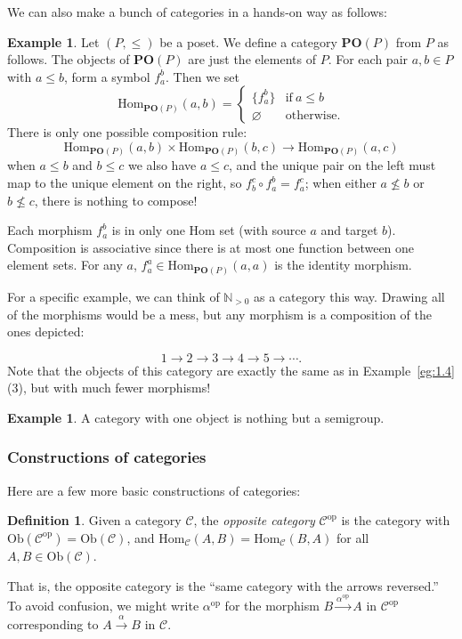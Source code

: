 \documentclass{amsart}[12pt]
\newcommand{\Hom}{\mathrm{Hom}}
\def\sC{\mathscr C}
\newcommand{\N}{\mathbb{N}}
\newcommand{\DEF}[1]{\emph{#1}\index{#1}}
\newcommand{\Def}[1]{#1 \index{#1}}
\numberwithin{equation}{section}
\theoremstyle{plain} %
\theoremstyle{definition}
\newtheorem{defn}[equation]{Definition}
\newtheorem{ex}[equation]{Example}
\theoremstyle{remark}
\newcommand{\sssec}[1]{\subsubsection{#1}}
\newcommand{\Ob}{\mathrm{Ob}}
\newcommand{\PO}{\mathbf{PO}}
\begin{document}
We can also make a bunch of categories in a hands-on way as follows:

\begin{ex} Let $(P,\leq)$ be a poset.
We define a category \Def{$\PO(P)$} from $P$ as follows. The objects of $\PO(P)$ are just the elements of $P$.
For each pair $a,b\in P$ with $a\leq b$, form a symbol $f_a^b$. Then we set
\[ \Hom_{\PO(P)}(a,b) = \begin{cases} \{f_a^b\} &\text{if}\  a\leq b \\ \varnothing & \text{otherwise}. \end{cases}\]
There is only one possible composition rule:
\[ \Hom_{\PO(P)}(a,b) \times \Hom_{\PO(P)}(b,c) \longrightarrow \Hom_{\PO(P)}(a,c)\]
when $a\leq b$ and $b\leq c$ we also have $a\leq c$, and the unique pair on the left must map to the unique element on the right, so $f_b^c \circ f_a^b = f_a^c$; when either $a\not\leq b$ or $b\not\leq c$, there is nothing to compose!

Each morphism $f_a^b$ is in only one Hom set (with source $a$ and target $b$). Composition is associative since there is at most one function between one element sets. For any $a$, $f_a^a\in \Hom_{\PO(P)}(a,a)$ is the identity morphism.

For a specific example, we can think of $\N_{> 0}$ as a category this way. Drawing all of the morphisms would be a mess, but any morphism is a composition of the ones depicted:

\[  1 \longrightarrow 2 \longrightarrow 3 \longrightarrow 4 \longrightarrow 5 \longrightarrow \cdots .\] 
Note that the objects of this category are exactly the same as in Example~\ref{eg:1.4}(3), but with much fewer morphisms!
\end{ex}

\begin{ex} A category with one object is nothing but a semigroup.\end{ex}

\sssec{Constructions of categories}

Here are a few more basic constructions of categories:

\begin{defn} Given a category $\sC$, the \DEF{opposite category} \Def{$\sC^{\mathrm{op}}$} is the category with $\Ob(\sC^{\mathrm{op}})=\Ob(\sC)$, and $\Hom_{\sC}(A,B) = \Hom_{\sC}(B,A)$ for all $A,B\in \Ob(\sC)$.
\end{defn}

That is, the opposite category is the ``same category with the arrows reversed.'' To avoid confusion, we might write $\alpha^{\mathrm{op}}$ for the morphism $B\stackrel{\alpha^{\mathrm{op}}}{\longrightarrow} A$ in $\sC^{\mathrm{op}}$ corresponding to $A \stackrel{\alpha}{\longrightarrow} B$ in $\sC$.
\end{document}
